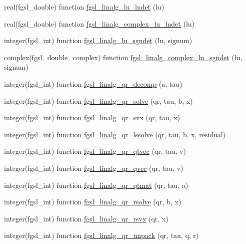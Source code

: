\begin{DoxyCompactItemize}
\item 
real(fgsl\+\_\+double) function \hyperlink{linalg_8finc_a52edf61cc5516e7caf8519816c749ab8}{fgsl\+\_\+linalg\+\_\+lu\+\_\+lndet} (lu)
\item 
real(fgsl\+\_\+double) function \hyperlink{linalg_8finc_a92abce3042e05ad514f7f22b06ed8c27}{fgsl\+\_\+linalg\+\_\+complex\+\_\+lu\+\_\+lndet} (lu)
\item 
integer(fgsl\+\_\+int) function \hyperlink{linalg_8finc_ad630c42318782e35aae8ddf417c988c7}{fgsl\+\_\+linalg\+\_\+lu\+\_\+sgndet} (lu, signum)
\item 
complex(fgsl\+\_\+double\+\_\+complex) function \hyperlink{linalg_8finc_a3ac75e4a38e037d1b4b652e84030665b}{fgsl\+\_\+linalg\+\_\+complex\+\_\+lu\+\_\+sgndet} (lu, signum)
\item 
integer(fgsl\+\_\+int) function \hyperlink{linalg_8finc_abae4bc6bf64efb5860b999ae7001bda7}{fgsl\+\_\+linalg\+\_\+qr\+\_\+decomp} (a, tau)
\item 
integer(fgsl\+\_\+int) function \hyperlink{linalg_8finc_a453aab0af228f854c2c4e21af6e0f950}{fgsl\+\_\+linalg\+\_\+qr\+\_\+solve} (qr, tau, b, x)
\item 
integer(fgsl\+\_\+int) function \hyperlink{linalg_8finc_a7029ed3e4a0df13a7599a87f5260e377}{fgsl\+\_\+linalg\+\_\+qr\+\_\+svx} (qr, tau, x)
\item 
integer(fgsl\+\_\+int) function \hyperlink{linalg_8finc_afee3a0235231a2e3707a21e1fb07173a}{fgsl\+\_\+linalg\+\_\+qr\+\_\+lssolve} (qr, tau, b, x, residual)
\item 
integer(fgsl\+\_\+int) function \hyperlink{linalg_8finc_a6987f9175c49215f6c78c48de3f01a1d}{fgsl\+\_\+linalg\+\_\+qr\+\_\+qtvec} (qr, tau, v)
\item 
integer(fgsl\+\_\+int) function \hyperlink{linalg_8finc_a8052f69f7485e6a05de0b1be501ed840}{fgsl\+\_\+linalg\+\_\+qr\+\_\+qvec} (qr, tau, v)
\item 
integer(fgsl\+\_\+int) function \hyperlink{linalg_8finc_a261ef794cdf8d3055ef837dd3691f785}{fgsl\+\_\+linalg\+\_\+qr\+\_\+qtmat} (qr, tau, a)
\item 
integer(fgsl\+\_\+int) function \hyperlink{linalg_8finc_a1560faca27750ff17598a738727114e2}{fgsl\+\_\+linalg\+\_\+qr\+\_\+rsolve} (qr, b, x)
\item 
integer(fgsl\+\_\+int) function \hyperlink{linalg_8finc_a0ea403e6c3ec1e67b25bfe4d6b710077}{fgsl\+\_\+linalg\+\_\+qr\+\_\+rsvx} (qr, x)
\item 
integer(fgsl\+\_\+int) function \hyperlink{linalg_8finc_af11174059688ffdbc3f368d6b1a731ee}{fgsl\+\_\+linalg\+\_\+qr\+\_\+unpack} (qr, tau, q, r)

\end{DoxyCompactItemize}
